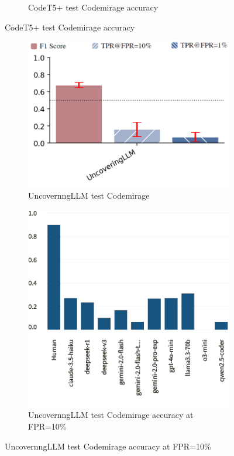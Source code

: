 \begin{figure}[H]
\begin{subfigure}[t]{0.4\textwidth}
        \caption{CodeT5+ test Codemirage accuracy}
        \label{fig:b2}
    \end{subfigure}
\end{figure}




\begin{figure}[H]
    \begin{subfigure}[b]{0.4\textwidth}
        \centering
        \includegraphics[width=\linewidth]{img/TEST/UncovernngLLM/ccffd05754577a21cc6a59268a66bfd331e7843ede30c92a0f3a8403.png}
        \caption{UncovernngLLM test Codemirage}
        \label{fig:3}
    \end{subfigure}
    \hfill
    \begin{subfigure}[t]{0.4\textwidth}
        \centering
        \includegraphics[width=\linewidth]{img/TEST/UncovernngLLM/visualization(311).png}
        \caption{UncovernngLLM test Codemirage accuracy at FPR=10\%}
        \label{fig:b3}
    \end{subfigure}
\end{figure}





